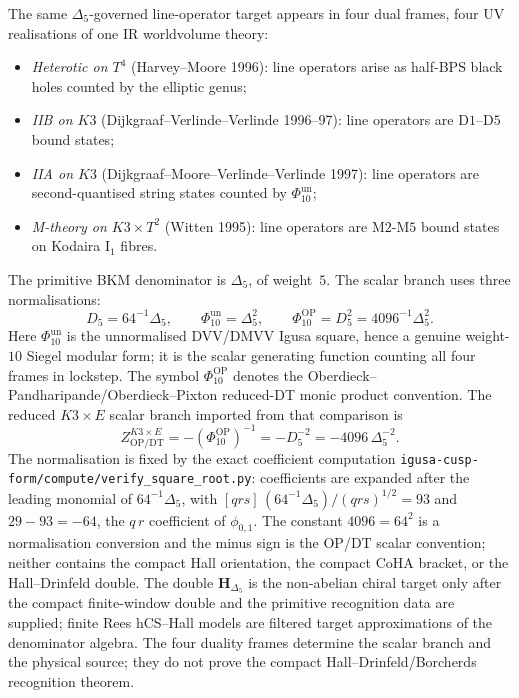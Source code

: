 \begin{remark}
\label{rem:line-operators-2}
The same $\Delta_5$-governed line-operator target appears in four dual
frames, four UV realisations of one IR
worldvolume theory:
\begin{itemize}
\item \emph{Heterotic on $T^4$} (Harvey--Moore 1996): line operators
 arise as half-BPS black holes counted by the elliptic genus;
\item \emph{IIB on $K3$} (Dijkgraaf--Verlinde--Verlinde 1996--97):
 line operators are D$1$--D$5$ bound states;
\item \emph{IIA on $K3$} (Dijkgraaf--Moore--Verlinde--Verlinde 1997):
 line operators are second-quantised string states counted by
 $\Phi_{10}^{\mathrm{un}}$;
\item \emph{M-theory on $K3\times T^2$} (Witten 1995): line operators
 are M$2$-M$5$ bound states on Kodaira I$_1$ fibres.
\end{itemize}
The primitive BKM denominator is $\Delta_5$, of weight~$5$. The scalar
branch uses three normalisations:
\[
 D_5=64^{-1}\Delta_5,\qquad
 \Phi_{10}^{\mathrm{un}}=\Delta_5^2,\qquad
 \Phi_{10}^{\mathrm{OP}}=D_5^2=4096^{-1}\Delta_5^2.
\]
Here $\Phi_{10}^{\mathrm{un}}$ is the unnormalised DVV/DMVV Igusa
square, hence a genuine weight-$10$ Siegel modular form; it is the
scalar generating function counting all four frames in lockstep.
The symbol $\Phi_{10}^{\mathrm{OP}}$ denotes the
Oberdieck--Pandharipande/Oberdieck--Pixton reduced-DT monic product
convention. The reduced \(K3 \times E\) scalar branch imported from that
comparison is
\[
 Z^{K3\times E}_{\mathrm{OP/DT}}
 =-(\Phi_{10}^{\mathrm{OP}})^{-1}
 =-D_5^{-2}
 =-4096\,\Delta_5^{-2}.
\]
The normalisation is fixed by the exact coefficient computation
\texttt{igusa-cusp-form/compute/verify\_square\_root.py}: coefficients
are expanded after the leading monomial of $64^{-1}\Delta_5$, with
$[qrs]\,(64^{-1}\Delta_5)/(qrs)^{1/2}=93$ and
$29-93=-64$, the $q\,r$ coefficient of $\phi_{0,1}$.
The constant \(4096=64^2\) is a normalisation conversion and
the minus sign is the OP/DT scalar convention; neither contains the
compact Hall orientation, the compact CoHA bracket, or the
Hall--Drinfeld double.
The double
$\mathbf H_{\Delta_5}$ is the non-abelian chiral target only after
the compact finite-window double and the primitive recognition data
are supplied; finite Rees hCS--Hall models are filtered target
approximations of the denominator algebra.
The four duality frames determine the scalar branch and the physical
source; they do not prove the compact Hall--Drinfeld/Borcherds
recognition theorem.
\end{remark}
